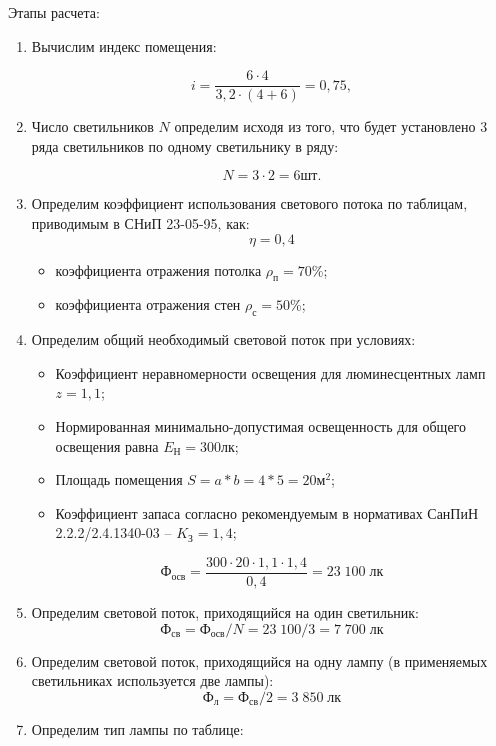 Этапы расчета:
\begin{enumerate}
\item Вычислим индекс помещения:

$$
i=\frac{6 \cdot 4 }{3,2 \cdot (4 + 6)} = 0,75,
$$

\item Число светильников $N$ определим исходя из того, что будет установлено 3 ряда светильников по одному светильнику в ряду:

$$ N = 3 \cdot 2 = 6 шт.$$ 

\item Определим коэффициент использования светового потока по таблицам, приводимым в СНиП 23-05-95, как:
$$ \eta = 0,4 $$
	\begin{itemize}
		\item коэффициента отражения потолка $\rho_п = 70$\%;
		\item коэффициента отражения стен $\rho_с = 50$\%;
	\end{itemize}
	
\item Определим общий необходимый световой поток при условиях:
\begin{itemize}
		\item Коэффициент неравномерности освещения для люминесцентных ламп $z = 1,1$;
		\item Нормированная минимально-допустимая освещенность для общего освещения равна $E_Н = 300 лк$;
		\item Площадь помещения $S=a*b=4*5=20 м^2$;
		\item Коэффициент запаса согласно рекомендуемым в нормативах СанПиН 2.2.2/2.4.1340-03 – $K_З = 1,4$;
	\end{itemize}
	
	$$ Ф_{осв}=\frac{300 \cdot 20 \cdot 1,1 \cdot 1,4}{ 0,4 } = 23 \; 100  \; лк$$
	\item Определим световой поток, приходящийся на один светильник:
	  $$ Ф_{св}= Ф_{осв}/N = {23 \; 100}/3 = 7 \; 700 \; лк $$
	 
	\item Определим световой поток, приходящийся на одну лампу (в применяемых светильниках используется две лампы):
	$$ Ф_л = Ф_{св}/2 = 3\;850 \; лк$$
	 \item Определим тип лампы по таблице:
	 

\end{enumerate}
